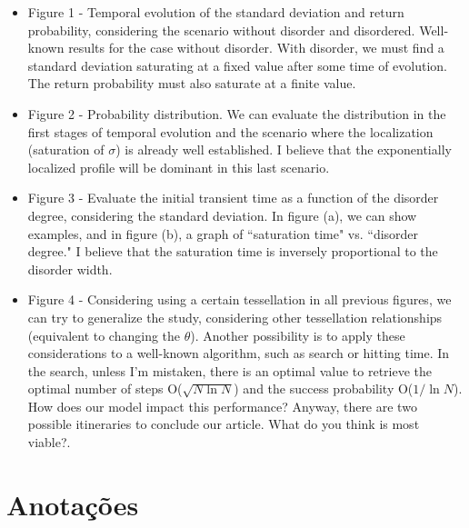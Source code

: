 \documentclass[11pt]{article}
\theoremstyle{plain}
\begin{document}
\begin{itemize}
    \item Figure 1 - Temporal evolution of the standard deviation and return
        probability, considering the scenario without disorder and disordered.
        Well-known results for the case without disorder. With disorder, we
        must find a standard deviation saturating at a fixed value after some
        time of evolution. The return probability must also saturate at a
        finite value.

    \item Figure 2 - Probability distribution. We can evaluate the distribution
        in the first stages of temporal evolution and the scenario where the
        localization (saturation of $\sigma$) is already well established. I
        believe that the exponentially localized profile will be dominant in
        this last scenario.

    \item Figure 3 - Evaluate the initial transient time as a function of the
        disorder degree, considering the standard deviation. In figure (a), we
        can show examples, and in figure (b), a graph of ``saturation time" vs.
        ``disorder degree." I believe that the saturation time is inversely
        proportional to the disorder width.

    \item Figure 4 - Considering using a certain tessellation in all previous
        figures, we can try to generalize the study, considering other
        tessellation relationships (equivalent to changing the $\theta$).
        Another possibility is to apply these considerations to a well-known
        algorithm, such as search or hitting time. In the search, unless I'm
        mistaken, there is an optimal value to retrieve the optimal number of
        steps O($\sqrt{N\ln N}$) and the success probability O($1/ \ln{N} $).
        How does our model impact this performance? Anyway, there are two
        possible itineraries to conclude our article. What do you think is most
        viable?.

\end{itemize}







\clearpage

\section{Anotações}
\end{document}

